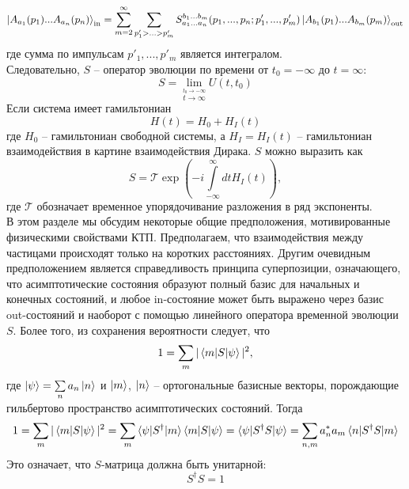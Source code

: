 \documentclass[12pt]{article}
\theoremstyle{definition}
\begin{document}
\begin{equation}\label{eq8}
    \ket{A_{a_1}(p_1)...A_{a_n}(p_n)}_{\text{in}}=\sum\limits_{m=2}^\infty\sum\limits_{p'_1>...>p'_m} S^{b_1...b_m}_{a_1...a_n}(p_1,...,p_n;p'_1,...,p'_m)\ket{A_{b_1}(p_1)...A_{b_m}(p_m)}_{\text{out}}
\end{equation}
где сумма по импульсам $p'_1,...,p'_m$ является интегралом.\\
Следовательно, $S$ -- оператор эволюции по времени от $t_0 = -\infty$ до $t =\infty$:
\begin{equation}
    S=\lim\limits_{\overset{t_0\rightarrow-\infty}{t\rightarrow\infty}}U(t,t_0)
\end{equation}
Если система имеет гамильтониан
\begin{equation}
    H(t)=H_0+H_I(t)
\end{equation}
где $H_0$ -- гамильтониан свободной системы, а $H_I=H_I(t)$ -- гамильтониан взаимодействия в картине взаимодействия Дирака. $S$ можно выразить как
\begin{equation}
    S=\mathcal{T}\exp\left(-i\int\limits_{-\infty}^\infty dtH_I(t)\right),
\end{equation}
где $\mathcal{T}$ обозначает временное упорядочивание разложения в ряд экспоненты.\\
В этом разделе мы обсудим некоторые общие предположения, мотивированные физическими свойствами КТП. Предполагаем, что взаимодействия между частицами происходят только на коротких расстояниях. Другим очевидным предположением является справедливость принципа суперпозиции, означающего, что асимптотические состояния образуют полный базис для начальных и конечных состояний, и любое in-состояние может быть выражено через базис out-состояний и наоборот с помощью линейного оператора временной эволюции $S$. Более того, из сохранения вероятности следует, что
\begin{equation}
    1=\sum\limits_m|\braket{m|S|\psi}|^2,
\end{equation}
где $\ket{\psi}=\sum\limits_na_n\ket{n}$ и $\ket{m}$, $\ket{n}$ -- ортогональные базисные векторы, порождающие гильбертово пространство асимптотических состояний. Тогда
\begin{equation}
    1=\sum\limits_m|\braket{m|S|\psi}|^2=\sum\limits_m\braket{\psi|S^\dagger|m}\braket{m|S|\psi}=\braket{\psi|S^\dagger S|\psi}=\sum\limits_{n,m}a^*_na_m\braket{n|S^\dagger S|m}
\end{equation}
Это означает, что $S$-матрица должна быть унитарной:
\begin{equation}
    S^\dagger S = 1
\end{equation}
\end{document}
